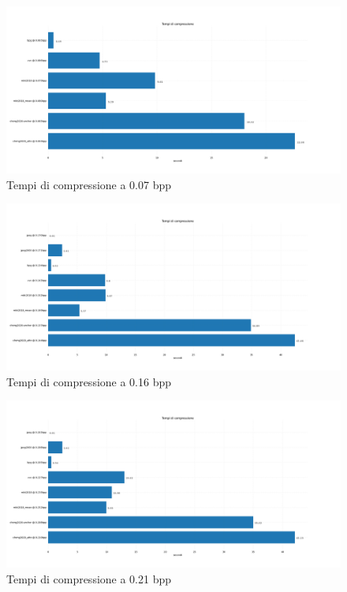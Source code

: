 \begin{figure}[!h]
    \centering
    \includegraphics[width=1\textwidth]{Immagini/METRICS/times@0.07bpp.png}
    \caption{Tempi di compressione a 0.07 bpp}
    \label{fig:times07}
\end{figure}
\newpage
\begin{figure}[!h]
    \centering
    \includegraphics[width=1\textwidth]{Immagini/METRICS/times@0.16bpp.png}
    \caption{Tempi di compressione a 0.16 bpp}
    \label{fig:times16}
\end{figure}
\hspace{0.5cm}
\begin{figure}[!h]
    \centering
    \includegraphics[width=1\textwidth]{Immagini/METRICS/times@0.21bpp.png}
    \caption{Tempi di compressione a 0.21 bpp}
    \label{fig:times21}
\end{figure}
